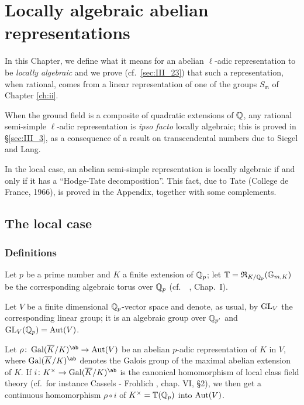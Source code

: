 \chapter{Locally algebraic abelian representations}
\label{ch:iii}

In this Chapter, we define what it means for an abelian $\ell$-adic
representation to be \emph{locally algebraic} and we prove (cf.\
\ref{sec:III_23}) that such a representation, when rational, comes from a
linear representation of one of the groups $S_{\mathfrak{m}}$ of Chapter
\ref{ch:ii}.

When the ground field is a composite of quadratic extensions of $\mathbb{Q}$, any
rational semi-simple $\ell$-adic representation is \emph{ipso facto} locally
algebraic; this is proved in \S\ref{sec:III_3}, as a consequence of a result on
transcendental numbers due to Siegel and Lang.

In the local case, an abelian semi-simple representation is
locally algebraic if and only if it has a ``Hodge-Tate decomposition''.
This fact, due to Tate (College de France, 1966), is proved in the
Appendix, together with some complements.

\section{The local case}
\label{sec:III_1}

\subsection{Definitions}
\label{sec:III_11}
Let $p$ be a prime number and $K$ a finite extension of $\mathbb{Q}_p$; let $\mathbb{T} =
\operatorname{\mathfrak{R}}_{K/\mathbb{Q}_p}(\mathbb{G}_{m, K})$ be the corresponding algebraic torus over
\dpage
$\mathbb{Q}_p$ (cf.\ \citeauthor{43}~\cite{43}, Chap.~I).

Let $V$ be a finite dimensional $\mathbb{Q}_p$-vector space and denote, as usual, by
$\operatorname{GL}_V$ the corresponding linear group; it is an algebraic group over $\mathbb{Q}_{p'}$
and $\operatorname{GL}_V(\mathbb{Q}_p) = \operatorname{Aut} (V)$.

Let $\rho \colon \Gal(\overline{K}/K)^{\ab} \to \Aut(V)$ be an abelian $p$-adic
representation of $K$ in $V$, where $\Gal(\overline{K}/K)^{\ab}$ denotes the
Galois group of the maximal abelian extension of $K$. If $i \colon K^\times \to
\Gal(\overline{K}/K)^{\ab}$ is the canonical homomorphism of local class field
theory (cf.\ for instance Cassels - Fr\¨ohlich \cite{6}, chap. VI, \S2), we then
get a continuous homomorphism $\rho \circ i$ of $K^\times = \mathbb{T}(\mathbb{Q}_p)$ into
$\operatorname{Aut}(V)$.

